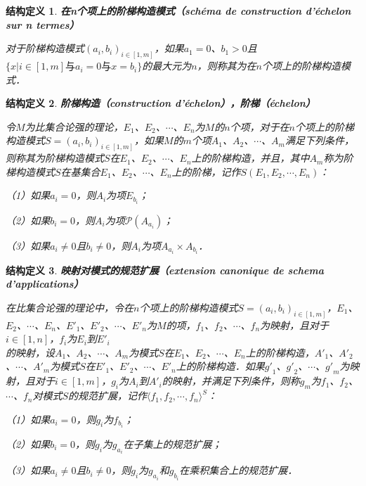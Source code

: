 \documentclass[12pt, a4paper, oneside]{book}
\newtheorem{STdef}{结构定义}
\begin{document}
			\begin{STdef}
				\textbf{在n个项上的阶梯构造模式（schéma de construction d'échelon sur n termes）}
				\par
				对于阶梯构造模式$(a_i, b_i)_{i\in [1, m]}$，如果$a_1=0$、$b_1>0$且$\{x|i\in [1, m]\text{与}a_i=0\text{与}x=b_i\}$的最大元为$n$，则称其为在$n$个项上的阶梯构造模式．
			\end{STdef}
			
			\begin{STdef}
				\textbf{阶梯构造（construction d'échelon），阶梯（échelon）}
				\par
				令$M$为比集合论强的理论，$E_1$、$E_2$、$\cdots$、$E_n$为$M$的$n$个项，对于在$n$个项上的阶梯构造模式$S=(a_i, b_i)_{i\in [1, m]}$，如果$M$的$m$个项$A_1$、$A_2$、$\cdots$、$A_m$满足下列条件，则称其为阶梯构造模式$S$在$E_1$、$E_2$、$\cdots$、$E_n$上的阶梯构造，并且，其中$A_m$称为阶梯构造模式$S$在基集合$E_1$、$E_2$、$\cdots$、$E_n$上的阶梯，记作$S(E_1, E_2, \cdots, E_n)$：
				\par
				（1）如果$a_i=0$，则$A_i$为项$E_{b_i}$；
				\par				（2）如果$b_i=0$，则$A_i$为项$\mathcal{P}(A_{a_i})$；
				\par
				（3）如果$a_i\neq 0$且$b_i\neq 0$，则$A_i$为项$A_{a_i}\times A_{b_i}$．
			\end{STdef}
			
			\begin{STdef}
				\textbf{映射对模式的规范扩展（extension canonique de schema \\d'applications）}
				\par
				在比集合论强的理论中，令在$n$个项上的阶梯构造模式$S=(a_i, b_i)_{i\in [1, m]}$，$E_1$、$E_2$、$\cdots$、$E_n$、${E'}_1$、${E'}_2$、$\cdots$、${E'}_n$为$M$的项，$f_1$、$f_2$、$\cdots$、$f_n$为映射，且对于$i\in [1, n]$，$f_i$为$E_i$到${E'}_i$\\的映射，设$A_1$、$A_2$、$\cdots$、$A_m$为模式$S$在$E_1$、$E_2$、$\cdots$、$E_n$上的阶梯构造，${A'}_1$、${A'}_2$、$\cdots$、${A'}_m$为模式$S$在${E'}_1$、${E'}_2$、$\cdots$、${E'}_n$上的阶梯构造．如果${g'}_1$、${g'}_2$、$\cdots$、${g'}_m$为映射，且对于$i\in [1, m]$，$g_i$为$A_i$到${A'}_i$的映射，并满足下列条件，则称$g_m$为$f_1$、$f_2$、$\cdots$、$f_n$对模式$S$的规范扩展，记作$\langle f_1, f_2, \cdots, f_n\rangle^S$：
				\par
				（1）如果$a_i=0$，则$g_i$为$f_{b_i}$；
				\par
				（2）如果$b_i=0$，则$g_i$为$g_{a_i}$在子集上的规范扩展；
				\par
				（3）如果$a_i\neq 0$且$b_i\neq 0$，则$g_i$为$g_{a_i}$和$g_{b_i}$在乘积集合上的规范扩展．
			\end{STdef}
			
\end{document}
